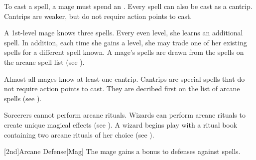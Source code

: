         To cast a spell, a mage must spend an .
        Every spell can also be cast as a cantrip.
        Cantrips are weaker, but do not require action points to cast.

        A 1st-level mage knows three spells.
        Every even level, she learns an additional spell.
        In addition, each time she gains a level, she may trade one of her existing spells for a different spell known.
        A mage's spells are drawn from the spells on the arcane spell list (see ).

        Almost all mages know at least one cantrip.
        Cantrips are special spells that do not require action points to cast.
        They are decribed first on the list of arcane spells (see ).

         Sorcerers cannot perform arcane rituals.
         Wizards can perform arcane rituals to create unique magical effects (see ).
        A wizard begins play with a ritual book containing two arcane rituals of her choice (see ).

        [2nd]{Arcane Defense}[Mag]
        The mage gains a  bonus to defenses against spells.

